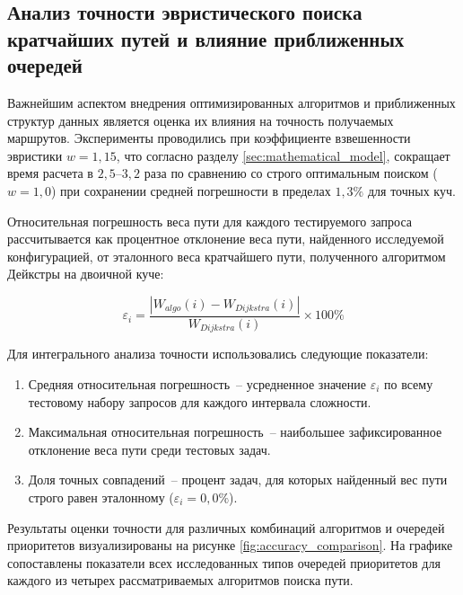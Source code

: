 \subsection{Анализ точности эвристического поиска кратчайших путей и влияние приближенных очередей}
\label{subsec:accuracy_analysis}

Важнейшим аспектом внедрения оптимизированных алгоритмов и приближенных структур данных является оценка их влияния на точность получаемых маршрутов. Эксперименты проводились при коэффициенте взвешенности эвристики $w = 1{,}15$, что согласно разделу \ref{sec:mathematical_model}, сокращает время расчета в $2{,}5$--$3{,}2$ раза по сравнению со строго оптимальным поиском ($w = 1{,}0$) при сохранении средней погрешности в пределах $1{,}3\%$ для точных куч.

Относительная погрешность веса пути для каждого тестируемого запроса рассчитывается как процентное отклонение веса пути, найденного исследуемой конфигурацией, от эталонного веса кратчайшего пути, полученного алгоритмом Дейкстры на двоичной куче:

\begin{equation}
    \varepsilon_i = \frac{|W_{algo}(i) - W_{Dijkstra}(i)|}{W_{Dijkstra}(i)} \times 100\%
\end{equation}

Для интегрального анализа точности использовались следующие показатели:
\begin{enumerate}
    \item Средняя относительная погрешность~-- усредненное значение $\varepsilon_i$ по всему тестовому набору запросов для каждого интервала сложности.
    \item Максимальная относительная погрешность~-- наибольшее зафиксированное отклонение веса пути среди тестовых задач.
    \item Доля точных совпадений~-- процент задач, для которых найденный вес пути строго равен эталонному ($\varepsilon_i = 0{,}0\%$).
\end{enumerate}

Результаты оценки точности для различных комбинаций алгоритмов и очередей приоритетов визуализированы на рисунке \ref{fig:accuracy_comparison}. На графике сопоставлены показатели всех исследованных типов очередей приоритетов для каждого из четырех рассматриваемых алгоритмов поиска пути.


